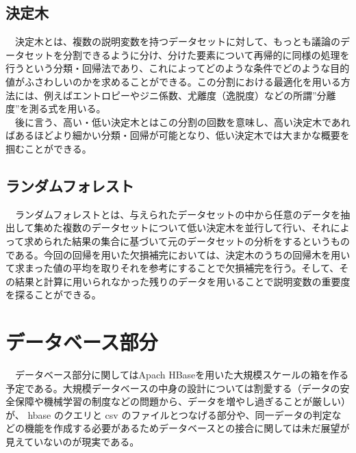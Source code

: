\documentclass{scrartcl}
\begin{document}
\subsection{決定木}
\label{sec:org2e05f12}
　決定木とは、複数の説明変数を持つデータセットに対して、もっとも議論のデータセットを分割できるように分け、分けた要素について再帰的に同様の処理を行うという分類・回帰法であり、これによってどのような条件でどのような目的値がふさわしいのかを求めることができる。この分割における最適化を用いる方法には、例えばエントロピーやジニ係数、尤離度（逸脱度）などの所謂”分離度”を測る式を用いる。\\
　後に言う、高い・低い決定木とはこの分割の回数を意味し、高い決定木であればあるほどより細かい分類・回帰が可能となり、低い決定木では大まかな概要を掴むことができる。\\

\subsection{ランダムフォレスト　}
\label{sec:org088a009}
　ランダムフォレストとは、与えられたデータセットの中から任意のデータを抽出して集めた複数のデータセットについて低い決定木を並行して行い、それによって求められた結果の集合に基づいて元のデータセットの分析をするというものである。今回の回帰を用いた欠損補完においては、決定木のうちの回帰木を用いて求まった値の平均を取りそれを参考にすることで欠損補完を行う。そして、その結果と計算に用いられなかった残りのデータを用いることで説明変数の重要度を探ることができる。\\

\section{データベース部分}
\label{sec:orgd6db3a4}
　データベース部分に関してはApach HBaseを用いた大規模スケールの箱を作る予定である。大規模データベースの中身の設計については割愛する（データの安全保障や機械学習の制度などの問題から、データを増やし過ぎることが厳しい）が、 hbase のクエリと csv のファイルとつなげる部分や、同一データの判定などの機能を作成する必要があるためデータベースとの接合に関しては未だ展望が見えていないのが現実である。\\
\end{document}
